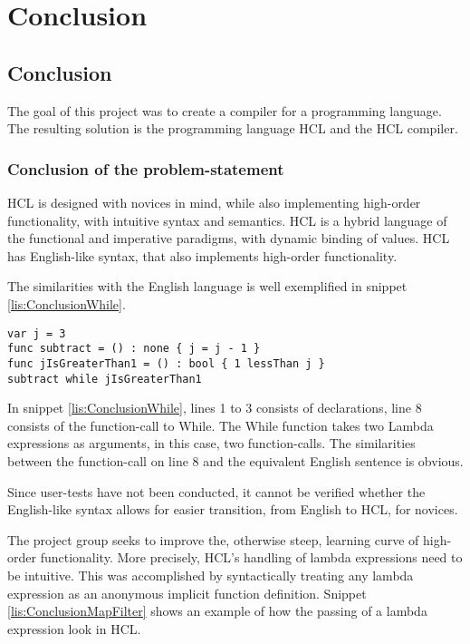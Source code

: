 \chapter{Conclusion}
\section{Conclusion}
The goal of this project was to create a compiler for a programming language.
The resulting solution is the programming language HCL and the HCL compiler.

\subsection{Conclusion of the problem-statement}
HCL is designed with novices in mind, while also implementing high-order functionality, with intuitive syntax and semantics.
HCL is a hybrid language of the functional and imperative paradigms, with dynamic binding of values.
HCL has English-like syntax, that also implements high-order functionality.

The similarities with the English language is well exemplified in snippet \ref{lis:ConclusionWhile}.
\begin{lstlisting}[language=hcl,label=lis:ConclusionWhile,caption=English-like syntax example]
var j = 3
func subtract = () : none { j = j - 1 }
func jIsGreaterThan1 = () : bool { 1 lessThan j }
subtract while jIsGreaterThan1
\end{lstlisting}
In snippet \ref{lis:ConclusionWhile}, lines 1 to 3 consists of declarations, line 8 consists of the function-call to While.
The While function takes two Lambda expressions as arguments, in this case, two function-calls.
The similarities between the function-call on line 8 and the equivalent English sentence is obvious.

Since user-tests have not been conducted, it cannot be verified whether the English-like syntax allows for easier transition, from English to HCL, for novices.

The project group seeks to improve the, otherwise steep, learning curve of high-order functionality.
More precisely, HCL's handling of lambda expressions need to be intuitive.
This was accomplished by syntactically treating any lambda expression as an anonymous implicit function definition.
Snippet \ref{lis:ConclusionMapFilter} shows an example of how the passing of a lambda expression look in HCL.

